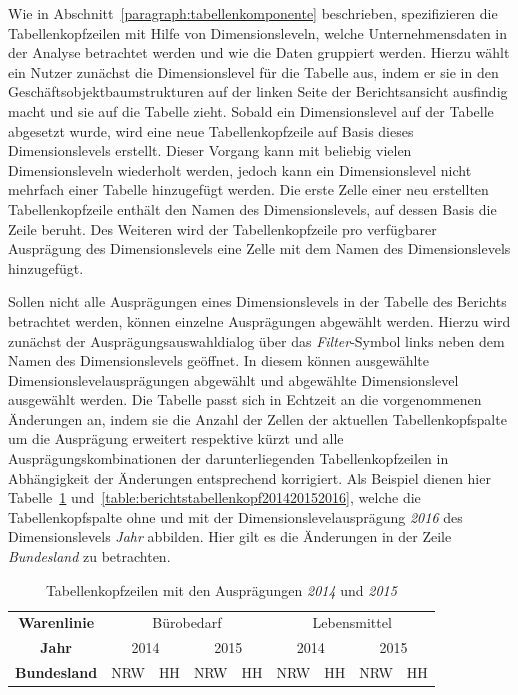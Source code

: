 \documentclass[
  language=german, %
  type=bachelor,%
  ngerman
]{isthesis}
\begin{document}
\begin{content}
  Wie in Abschnitt~\ref{paragraph:tabellenkomponente} beschrieben,
  spezifizieren die Tabellenkopfzeilen mit Hilfe von Dimensionsleveln, welche
  Unternehmensdaten in der Analyse betrachtet werden und wie die Daten
  gruppiert werden. Hierzu wählt ein Nutzer zunächst die Dimensionslevel für
  die Tabelle aus, indem er sie in den Geschäftsobjektbaumstrukturen auf der
  linken Seite der Berichtsansicht ausfindig macht und sie auf die Tabelle
  zieht. Sobald ein Dimensionslevel auf der Tabelle abgesetzt wurde, wird eine
  neue Tabellenkopfzeile auf Basis dieses Dimensionslevels erstellt. Dieser
  Vorgang kann mit beliebig vielen Dimensionsleveln wiederholt werden, jedoch
  kann ein Dimensionslevel nicht mehrfach einer Tabelle hinzugefügt werden. Die
  erste Zelle einer neu erstellten Tabellenkopfzeile enthält den Namen des
  Dimensionslevels, auf dessen Basis die Zeile beruht. Des Weiteren wird der
  Tabellenkopfzeile pro verfügbarer Ausprägung des Dimensionslevels eine Zelle
  mit dem Namen des Dimensionslevels hinzugefügt.

  Sollen nicht alle Ausprägungen eines Dimensionslevels in der Tabelle des
  Berichts betrachtet werden, können einzelne Ausprägungen abgewählt werden.
  Hierzu wird zunächst der Ausprägungsauswahldialog über das
  \textit{Filter}-Symbol links neben dem Namen des Dimensionslevels geöffnet.
  In diesem können ausgewählte Dimensionslevelausprägungen abgewählt und abgewählte
  Dimensionslevel ausgewählt werden. Die Tabelle passt sich in Echtzeit an die
  vorgenommenen Änderungen an, indem sie die Anzahl der Zellen der aktuellen
  Tabellenkopfspalte um die Ausprägung erweitert respektive kürzt und alle
  Ausprägungskombinationen der darunterliegenden Tabellenkopfzeilen in
  Abhängigkeit der Änderungen entsprechend korrigiert. Als Beispiel dienen hier
  Tabelle~\ref{table:berichtstabellenkopf20142015}
  und~\ref{table:berichtstabellenkopf201420152016}, welche die Tabellenkopfspalte
  ohne und mit der Dimensionslevelausprägung \textit{2016} des Dimensionslevels
  \textit{Jahr} abbilden. Hier gilt es die Änderungen in der Zeile
  \textit{Bundesland} zu betrachten.

    \begin{table}[]
      \footnotesize
      \begin{tabular}{c c c c c c c c c}
        \textbf{Warenlinie} & \multicolumn{4}{c}{Bürobedarf} & \multicolumn{4}{c}{Lebensmittel} \\
            \cmidrule(lr){2-5}\cmidrule(lr){6-9}
        \textbf{Jahr} & \multicolumn{2}{c}{2014} & \multicolumn{2}{c}{2015} & \multicolumn{2}{c}{2014} & \multicolumn{2}{c}{2015}\\
            \cmidrule(lr){2-3}\cmidrule(lr){4-5}\cmidrule(lr){6-7}\cmidrule(lr){8-9}
        \textbf{Bundesland} & NRW & HH & NRW & HH & NRW & HH & NRW & HH \\
      \end{tabular}
      \caption{Tabellenkopfzeilen mit den Ausprägungen \textit{2014} und \textit{2015}}\label{table:berichtstabellenkopf20142015}
    \end{table}


\end{content}
\end{document}
